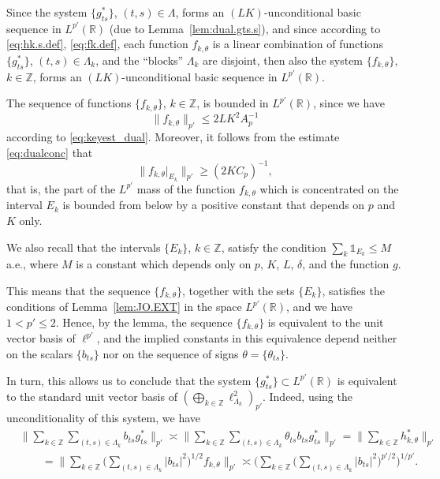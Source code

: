 \documentclass[reqno,a4paper,12pt]{amsart}
\numberwithin{equation}{section}
\numberwithin{figure}{section}
\newcommand\R{\mathbb{R}}
\newcommand\Z{\mathbb{Z}}
\newcommand\del{\delta}
\newcommand\Lam{\Lambda}
\newcommand\1{\mathds{1}}
\renewcommand\le{\leqslant}
\renewcommand\ge{\geqslant}
\newcommand\sbt{\subset}
\theoremstyle{plain}
\newcommand{\lemref}[1]{Lemma~\ref{#1}}
\theoremstyle{definition}
\begin{document}
Since the system $\{ g_{ts}^* \}$, $(t,s) \in\Lambda$, forms an $(LK)$-unconditional 
basic sequence in $L^{p'}(\R)$  (due to  \lemref{lem:dual.gts.s}),
 and since according to \eqref{eq:hk.s.def}, \eqref{eq:fk.def},
 each function $f_{k,\theta}$ is a linear combination of functions 
$\{ g_{ts}^* \}$, $(t,s)\in\Lambda_k$, and the ``blocks''
$\Lam_k$ are disjoint,  then also the system 
$\{ f_{k,\theta} \}$, $k \in \Z$,  forms an $(LK)$-unconditional basic sequence
in $L^{p'}(\R)$.
  
The sequence of functions $\{f_{k,\theta}\}$, $k\in\Z$, is bounded in $L^{p'}(\R)$, since we have
\begin{equation}
\|f_{k,\theta}\|_{p'} \le 2LK^2 A_p^{-1}
\end{equation}
according to \eqref{eq:keyest_dual}.
Moreover,  it follows from the estimate \eqref{eq:dualconc} that 
\begin{equation}
\|f_{k,\theta}|_{E_k}\|_{p'}\ge (2KC_p)^{-1},
\end{equation}
that is, the part of the $L^{p'}$ mass of the function $f_{k,\theta}$ which
is concentrated on the interval $E_k$ is bounded from below by
a positive constant that depends on $p$ and $K$ only.

We also recall that the intervals 
$\{ E_k \}$, $k \in \Z$,  satisfy the condition $\sum_k \1_{E_k}\le M$ a.e., 
where $M$ is a constant  which depends only on $p$, $K$, $L$, $\del$, and the function $g$.



This  means that the sequence $\{ f_{k,\theta} \}$, together 
with the sets $\{E_k\}$, satisfies the conditions of 
\lemref{lem:JO.EXT} in the space $L^{p'}(\R)$, and we have
$1 < p' \le 2$. Hence, by the lemma, the  sequence 
 $\{ f_{k,\theta} \}$ is equivalent to the unit vector
 basis of  $\ell^{p'}$, and the implied constants
 in this equivalence depend 
neither on the scalars $\{b_{ts}\}$ nor on the 
sequence of signs $\theta = \{\theta_{ts}\}$.

In turn, this allows us to conclude that the system $\{g_{ts}^*\} \sbt L^{p'}(\R)$
 is equivalent to the standard unit vector basis of $(\bigoplus_{k\in\Z} \ell^2_{\Lambda_k})_{p'}$. Indeed, using the unconditionality of this system, we have
\begin{align}
&\Big\| \sum_{k\in\Z} \sum_{(t,s)\in\Lambda_k} b_{ts} g^*_{ts} \Big\|_{p'}
\asymp \Big\| \sum_{k\in\Z} \sum_{(t,s)\in\Lambda_k} \theta_{ts}b_{ts} g^*_{ts} \Big\|_{p'} 
= \Big\| \sum_{k\in\Z} h_{k,\theta}^* \Big\|_{p'} \label{eq:equiv.gts.1} \\
& \qquad = \Big\|\sum_{k\in\Z}  \Big(\sum_{(t,s)\in\Lambda_k}
 |b_{ts}|^2\Big)^{1/2}  f_{k, \theta} \Big\|_{p'} 
 \asymp \Big(\sum_{k\in\Z}\Big( \sum_{(t,s)\in\Lambda_k}
 |b_{ts}|^2 \Big)^{p'/2} \Big)^{1/p'}. \label{eq:equiv.gts.2}
\end{align}
\end{document}
